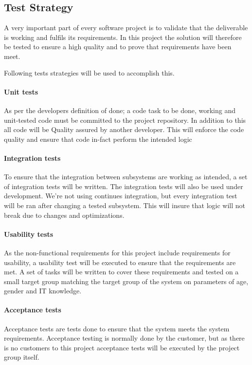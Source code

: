 \documentclass[../report.tex]{subfiles}
\begin{document}
\graphicspath{{img/}{../img/}}

\subsection{Test Strategy}

A very important part of every software project is to validate that the deliverable is working and fulfils its requirements. In this project the solution will therefore be tested to ensure a high quality and to prove that requirements have been meet.

Following tests strategies will be used to accomplish this.

\paragraph{Unit tests}
As per the developers definition of done; a code task to be done, working and unit-tested code must be committed to the project repository. In addition to this all code will be Quality assured by another developer. This will enforce the code quality and ensure that code in-fact perform the intended logic

\paragraph{Integration tests}

To ensure that the integration between subsystems are working as intended, a set of integration tests will be written. The integration tests will also be used under development. We're not using continues integration, but every integration test will be ran after changing a tested subsystem. This will insure that logic will not break due to changes and optimizations.

\paragraph{Usability tests}
As the non-functional requirements for this project include requirements for usability, a usability test will be executed to ensure that the requirements are met. A set of tasks will be written to cover these requirements and tested on a small target group matching the target group of the system on parameters of age, gender and IT knowledge.

\paragraph{Acceptance tests}
Acceptance tests are tests done to ensure that the system meets the system requirements. Acceptance testing is normally done by the customer, but as there is no customers to this project acceptance tests will be executed by the project group itself.
\end{document}
